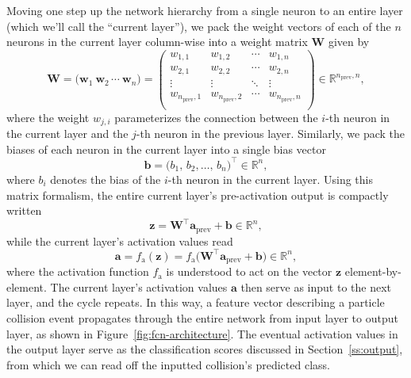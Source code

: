 \documentclass[11pt, a4paper]{article}
\renewcommand{\vec}[1]{\bm{#1}}
\newcommand{\mat}[1]{\mathbf{#1}}
\newcommand{\W}{\mat{W}}
\newcommand{\w}{\vec{w}}
\renewcommand{\b}{\vec{b}}
\newcommand{\z}{\vec{z}}
\renewcommand{\a}{\vec{a}}
\begin{document}
Moving one step up the network hierarchy from a single neuron to an entire layer (which we'll call the ``current layer''), we pack the weight vectors of each of the $ n $ neurons in the current layer column-wise into a weight matrix $ \W $ given by
\begin{equation*}
   \W = \Big( \w_{1} \ \w_{2} \, \cdots \ \w_{n} \Big) =
    \begin{pmatrix}
        w_{1, 1} & w_{1, 2} & \cdots & w_{1, n}\\
        w_{2, 1} & w_{2, 2} & \cdots & w_{2, n}\\
        \vdots & \vdots & \ddots & \vdots\\
        w_{n_{\text{prev}}, 1} & w_{n_{\text{prev}}, 2} & \cdots & w_{n_{\text{prev}}, n}\\
    \end{pmatrix} \in \mathbb{R}^{n_{\text{prev}}, n},
\end{equation*}
where the weight $ w_{j, i} $ parameterizes the connection between the $ i $-th neuron in the current layer and the $ j $-th neuron in the previous layer.
Similarly, we pack the biases of each neuron in the current layer into a single bias vector
\begin{equation*}
    \b = \big( b_{1}, \, b_{2}, \ldots, \, b_{n} \big)^{\top} \in \mathbb{R}^{n},
\end{equation*}
where $ b_{i} $ denotes the bias of the $ i $-th neuron in the current layer.
Using this matrix formalism, the entire current layer's pre-activation output is compactly written
\begin{equation*}
    \vec{z} = \W^{\top} \a_{\text{prev}} + \b \in \mathbb{R}^{n},
\end{equation*}
while the current layer's activation values read
\begin{equation*}
    \a = f_{\text{a}}(\z) = f_{\text{a}} \Big( \W^{\top} \a_{\text{prev}} + \b\Big) \in \mathbb{R}^{n},
\end{equation*}
where the activation function $ f_{\text{a}} $ is understood to act on the vector $ \z $ element-by-element.
The current layer's activation values $ \a $ then serve as input to the next layer, and the cycle repeats.
In this way, a feature vector describing a particle collision event propagates through the entire network from input layer to output layer, as shown in Figure~\ref{fig:fcn-architecture}.
The eventual activation values in the output layer serve as the classification scores discussed in Section~\ref{ss:output}, from which we can read off the inputted collision's predicted class.
\end{document}
